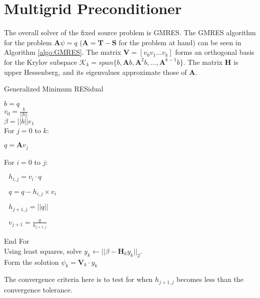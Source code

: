 \documentclass[12pt, letterpaper]{article}
\newcommand{\ve}[1]{\ensuremath{\mathbf{#1}}}
\begin{document}
\section{Multigrid Preconditioner}
The overall solver of the fixed source problem is GMRES. The GMRES algorithm for the problem $\ve{A} \psi = q$ ($\ve{A} = \ve{T} - \ve{S}$ for the problem at hand) can be seen in Algorithm \ref{algo:GMRES}. The matrix $\ve{V} = [v_{0} v_{1} ... v_{k}]$ forms an orthogonal basis for the Krylov subspace $\mathcal{K}_{k} = span\{b, \ve{A}b, \ve{A}^{2}b, ..., \ve{A}^{k-1}b\}$. The matrix $\ve{H}$ is upper Hessenberg, and its eigenvalues approximate those of $\ve{A}$.
%
\begin{algorithm}
  \caption{ Generalized Minimum RESidual}
  $b = q$ \\
  $v_0 = \frac{b}{||b||}$ \\
  $\beta = ||b|| e_1$ \\
  For $j = 0$ to $k$: 
  \begin{list}{}{\hspace{2em}}
    \item $\text{} q = \ve{A}v_{j}$
    \item For $i = 0$ to $j$:
    \begin{list}{}{\hspace{2em}}
       \item $\text{ } h_{i,j} = v_{i} \cdot q$
       \item $\text{ } q = q - h_{i,j} \times v_{i}$
    \end{list} 
    \item $\text{ } h_{j+1,j} = ||q||$ 
    \item $\text{ } v_{j+1} = \frac{q} {h_{j+1,j}}$ 
  \end{list}
  End For \\
  Using least squares, solve $y_k \leftarrow ||\beta - \ve{H}_{k} y_{k}||_{2}$. \\
  Form the solution $\psi_k = \ve{V}_k \cdot y_k$
  \label{algo:GMRES}
\end{algorithm}
%
The convergence criteria here is to test for when $h_{j+1,j}$ becomes less than the convergence tolerance. 
\end{document}
